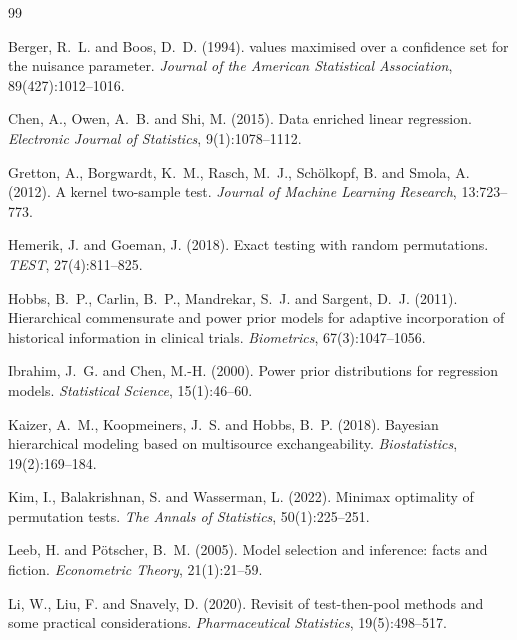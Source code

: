 \begin{thebibliography}{99}
\small

Berger, R.~L. and Boos, D.~D. (1994).
 values maximised over a confidence set for the nuisance parameter.
\newblock \emph{Journal of the American Statistical Association}, 89(427):1012--1016.

Chen, A., Owen, A.~B. and Shi, M. (2015).
\newblock Data enriched linear regression.
\newblock \emph{Electronic Journal of Statistics}, 9(1):1078--1112.

Gretton, A., Borgwardt, K.~M., Rasch, M.~J., Sch\"olkopf, B. and Smola, A. (2012).
\newblock A kernel two-sample test.
\newblock \emph{Journal of Machine Learning Research}, 13:723--773.

Hemerik, J. and Goeman, J. (2018).
\newblock Exact testing with random permutations.
\newblock \emph{TEST}, 27(4):811--825.

Hobbs, B.~P., Carlin, B.~P., Mandrekar, S.~J. and Sargent, D.~J. (2011).
\newblock Hierarchical commensurate and power prior models for adaptive incorporation of historical information in clinical trials.
\newblock \emph{Biometrics}, 67(3):1047--1056.

Ibrahim, J.~G. and Chen, M.-H. (2000).
\newblock Power prior distributions for regression models.
\newblock \emph{Statistical Science}, 15(1):46--60.

Kaizer, A.~M., Koopmeiners, J.~S. and Hobbs, B.~P. (2018).
\newblock Bayesian hierarchical modeling based on multisource exchangeability.
\newblock \emph{Biostatistics}, 19(2):169--184.

Kim, I., Balakrishnan, S. and Wasserman, L. (2022).
\newblock Minimax optimality of permutation tests.
\newblock \emph{The Annals of Statistics}, 50(1):225--251.

Leeb, H. and P\"otscher, B.~M. (2005).
\newblock Model selection and inference: facts and fiction.
\newblock \emph{Econometric Theory}, 21(1):21--59.

Li, W., Liu, F. and Snavely, D. (2020).
\newblock Revisit of test-then-pool methods and some practical considerations.
\newblock \emph{Pharmaceutical Statistics}, 19(5):498--517.


\end{thebibliography}
